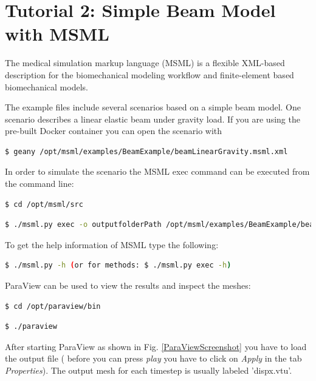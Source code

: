 \chapter{Tutorial 2: Simple Beam Model with MSML}

The medical simulation markup language (MSML) is a flexible XML-based description for the biomechanical modeling workflow and finite-element based biomechanical models.

The example files include several scenarios based on a simple beam model. One scenario describes a linear elastic beam under gravity load. If you are using the pre-built Docker container you can open the scenario with 
\begin{lstlisting}[language=sh, breaklines=true]
$ geany /opt/msml/examples/BeamExample/beamLinearGravity.msml.xml
\end{lstlisting}

In order to simulate the scenario the MSML exec command can be executed from the command line:
\begin{lstlisting}[language=sh, breaklines=true]
$ cd /opt/msml/src
\end{lstlisting}
\begin{lstlisting}[language=sh, breaklines=true]
$ ./msml.py exec -o outputfolderPath /opt/msml/examples/BeamExample/beamLinearGravity.msml.xml
\end{lstlisting}

To get the help information of MSML type the following:
\begin{lstlisting}[language=sh, breaklines=true]
$ ./msml.py -h (or for methods: $ ./msml.py exec -h)
\end{lstlisting}

ParaView can be used to view the results and inspect the meshes:
\begin{lstlisting}[language=sh, breaklines=true]
$ cd /opt/paraview/bin
\end{lstlisting}
\begin{lstlisting}[language=sh, breaklines=true]
$ ./paraview
\end{lstlisting}

After starting ParaView as shown in Fig. \ref{ParaViewScreenshot} you have to load the output file (
before you can press \emph{play} you have to click on \emph{Apply} in the tab \emph{Properties}). The output mesh for each timestep is usually labeled 'dispx.vtu'.

